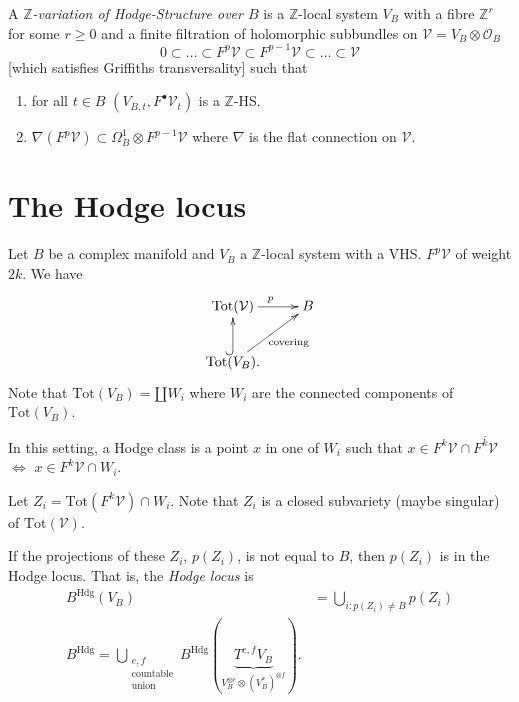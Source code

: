 \begin{definition}
\label{definition-z-variation}
A {\it $\mathbb{Z}$-variation of
Hodge-Structure over $B$}
is a $\mathbb{Z}$-local system $V_B$ with a
fibre  $\mathbb{Z}^r$ for some $r\geq 0$
and a finite filtration
of holomorphic subbundles on $\mathcal{V}=V_B
\otimes \mathcal{O}_B$
$$
0\subset…\subset F^p\mathcal{V}
\subset F^{p-1}\mathcal{V}
\subset…\subset \mathcal{V}
$$
[which satisfies Griffiths transversality]
such that
\begin{enumerate}
\item for all $t \in B$ $(V_{B,t},F^\bullet
\mathcal{V}_t)$
is a $\mathbb{Z}$-HS.
\item $\nabla(F^p\mathcal{V})\subset
\Omega^1_B \otimes F^{p-1}\mathcal{V}$
where $\nabla$ is the flat connection on
$\mathcal{V}$.
\end{enumerate}

\end{definition}

\section{The Hodge locus}
\label{section-hodge-locus}


Let $B$ be a complex manifold and $V_B$ a
$\mathbb{Z}$-local system
with a VHS. $F^p\mathcal{V}$ of weight $2k$.
We have
$$
\xymatrix{
\text{Tot}(\mathcal{V})\ar[r]^p
& B\\
\text{Tot}(V_B)\ar@{^{(}->}[u]\ar[ur]
_{\text{covering}}.
}
$$
Note that $\text{Tot}(V_B)=\amalg W_i$
where $W_i$ are the connected components of
$\text{Tot}(V_B)$.

In this setting, a Hodge class is a point $x$
in one of $W_i$
such that $x \in F^k\mathcal{V} \cap
\overline{F^k\mathcal{V}}$
$\iff$
$x \in F^k\mathcal{V} \cap W_i$.

Let $Z_i=\text{Tot}(F^k\mathcal{V})\cap W_i$.
Note that $Z_i$ is a closed subvariety (maybe
singular)
of $\text{Tot}(\mathcal{V})$.

If the projections of these $Z_i$, $p(Z_i)$,
is not equal to $B$,
then $p(Z_i)$ is in the Hodge locus.
That is, the {\it Hodge locus} is
$$
\begin{aligned}
B^{\text{Hdg}}(V_B)&=\bigcup_{i:p(Z_i)\neq
B}p(Z_i)\\
B^{\text{Hdg}}=\bigcup_{\substack{e,f \\
\text{countable}\\\text{union}}}
B^{\text{Hdg}}(\underbrace{T^{e,f}V_B}_{
V_B^{\otimes e}\otimes(V^*_B)^{\otimes f}}).
\end{aligned}
$$

